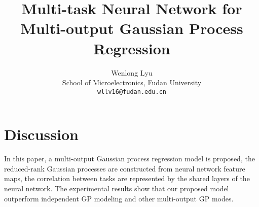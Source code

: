 \documentclass{article}
\title{Multi-task Neural Network for Multi-output Gaussian Process Regression}
\author{
  Wenlong Lyu \\
  School of Microelectronics, Fudan University\\
  \texttt{wllv16@fudan.edu.cn} \\
}
\begin{document}

\maketitle








\section{Discussion}

In this paper, a multi-output Gaussian process regression model is proposed, the reduced-rank Gaussian processes are constructed from neural network feature maps, the correlation between tasks are represented by the shared layers of the neural network. The experimental results show that our proposed model outperform independent GP modeling and other multi-output GP modes. 



\FloatBarrier



\end{document}
